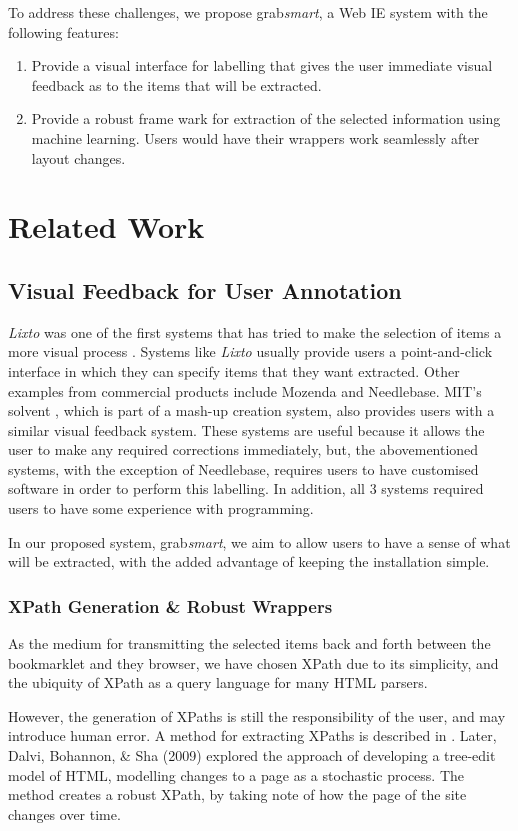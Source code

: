 \documentclass[a4paper,12pt]{nurop}
\begin{document}
To address these challenges, we propose grab\textit{smart}, a Web IE system with the following 
features:
\begin{enumerate}
	\item Provide a visual interface for labelling that gives the user immediate visual feedback
	as to the items that will be extracted.
	\item Provide a robust frame wark for extraction of the selected information using machine
	learning. Users would have their wrappers work seamlessly after layout changes.
\end{enumerate}

\section{Related Work}
\subsection{Visual Feedback for User Annotation}
\textit{Lixto} was one of the first systems that has tried to make the selection of items a
more visual process \cite{Baumgartner2001}. Systems like \textit{Lixto} usually provide users
a point-and-click interface in which they can specify items that they want extracted. Other
examples from commercial products include Mozenda and Needlebase. MIT's solvent , which is part
of a mash-up creation system, also provides users with a similar visual feedback system.
	These systems are useful because it allows the user to make any required corrections
immediately, but, the abovementioned systems, with the exception of Needlebase, requires users
to have customised software in order to perform this labelling. In addition, all 3 systems
required users to have some experience with programming.

In our proposed system, grab\textit{smart}, we aim to allow users to have a sense of what will be
extracted, with the added advantage of keeping the installation simple.
\subsubsection{XPath Generation \& Robust Wrappers}
As the medium for transmitting the selected items back and forth between the bookmarklet and
they browser, we have chosen XPath due to its simplicity, and the ubiquity of XPath as a 
query language for many HTML parsers.

However, the generation of XPaths is still the responsibility of the user, and may introduce
human error. A method for extracting XPaths is described in \cite{Anton2004}.
Later, Dalvi, Bohannon, \& Sha (2009) explored the approach of developing a tree-edit model of HTML,
modelling changes to a page as a stochastic process. The method creates a robust XPath, by taking note
of how the page of the site changes over time.
\end{document}
